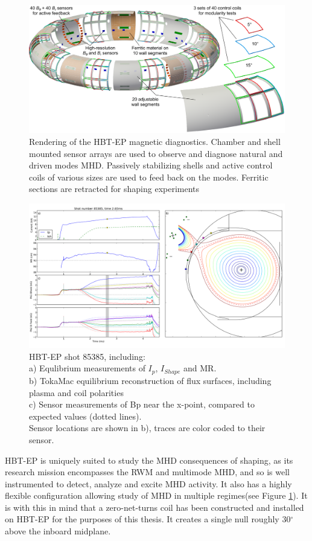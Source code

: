 \documentclass[aps,prl,twocolumn,superscriptaddress,groupedaddress]{revtex4}  %
\begin{document}
\begin{figure}[htb]
	\centering
	\includegraphics[scale=.25]{../Plots/Plasma_with_sensors_FWall_concept_WithCCview.png}
	\caption{Rendering of the HBT-EP magnetic diagnostics.  Chamber and shell mounted sensor arrays are used to observe and diagnose natural and driven modes MHD.  Passively stabilizing shells and active control coils of various sizes are used to feed back on the modes.  Ferritic sections are retracted for shaping experiments}
	\label{schematic}
	\end{figure}
	
\begin{figure}[t]
	\centering
\includegraphics[scale=.4]{../Plots/shot_85388_currents_fields_fluxes_better_aspect_ratio_polarity.png}\caption{HBT-EP shot 85385, including: \\a) Equlibrium measurements of $I_p$, $I_{Shape}$ and MR.\\  b) TokaMac equilibrium reconstruction of flux surfaces, including plasma and coil polarities\\c) Sensor measurements of Bp near the x-point, compared to expected values (dotted lines).\\  Sensor locations are shown in b), traces are color coded to their sensor.\\}
	\label{fluxes and fields}
\end{figure}
HBT-EP is uniquely suited to study the MHD consequences of shaping, as its research mission encompasses the RWM and multimode MHD, and so is well instrumented to detect, analyze and excite MHD activity.  It also has a highly flexible configuration allowing study of MHD in multiple regimes(see Figure \ref{schematic}). It is with this in mind that a zero-net-turns coil has been constructed and installed on HBT-EP for the purposes of this thesis.  It creates a single null roughly 30${^\circ}$ above the inboard midplane.
\end{document}
